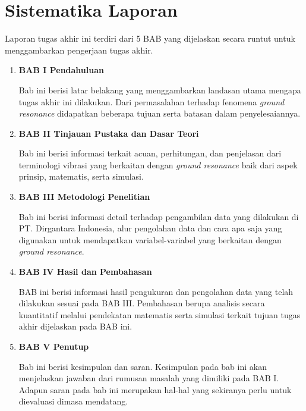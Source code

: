 \section{Sistematika Laporan}
\label{sec:sistematikalaporan}

Laporan tugas akhir ini terdiri dari 5 BAB yang dijelaskan secara runtut untuk menggambarkan pengerjaan tugas akhir.

\begin{enumerate}[nolistsep]

  \item \textbf{BAB I Pendahuluan}

        Bab ini berisi latar belakang yang menggambarkan landasan utama mengapa tugas akhir ini dilakukan. Dari permasalahan terhadap fenomena \textit{ground resonance} didapatkan beberapa tujuan serta batasan dalam penyelesaiannya.

        \vspace{2ex}

  \item \textbf{BAB II Tinjauan Pustaka dan Dasar Teori}

        Bab ini berisi informasi terkait acuan, perhitungan, dan penjelasan dari terminologi vibrasi yang berkaitan dengan \textit{ground resonance} baik dari aspek prinsip, matematis, serta simulasi.

        \vspace{2ex}

  \item \textbf{BAB III Metodologi Penelitian}

        Bab ini berisi informasi detail terhadap pengambilan data yang dilakukan di PT. Dirgantara Indonesia, alur pengolahan data dan cara apa saja yang digunakan untuk mendapatkan variabel-variabel yang berkaitan dengan \textit{ground resonance}.

        \vspace{2ex}

  \item \textbf{BAB IV Hasil dan Pembahasan}

        BAB ini berisi informasi hasil pengukuran dan pengolahan data yang telah dilakukan sesuai pada BAB III. Pembahasan berupa analisis secara kuantitatif melalui pendekatan matematis serta simulasi terkait tujuan tugas akhir dijelaskan pada BAB ini.

        \vspace{2ex}

  \item \textbf{BAB V Penutup}

        Bab ini berisi kesimpulan dan saran. Kesimpulan pada bab ini akan menjelaskan jawaban dari rumusan masalah yang dimiliki pada BAB I. Adapun saran pada bab ini merupakan hal-hal yang sekiranya perlu untuk dievaluasi dimasa mendatang.

\end{enumerate}
